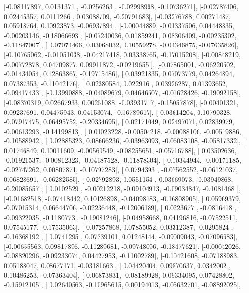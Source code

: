 \documentclass{article}
\begin{document}
       [-0.08117897,  0.0131371 , -0.0256263 , -0.02998998, -0.10736271],
       [-0.02787406,  0.02445357,  0.0111266 ,  0.03088709, -0.20791683],
       [-0.03276788,  0.00271487,  0.05918764,  0.10923873, -0.06937894],
       [-0.00044889, -0.01337506,  0.04448835, -0.00203146, -0.18066693],
       [-0.07240036,  0.01859241,  0.08306409, -0.00235302, -0.11847007],
       [ 0.07074466,  0.03068032,  0.10559278, -0.04346875, -0.07635826],
       [-0.10765062, -0.01051038, -0.04217418,  0.03338765, -0.17015208],
       [-0.00848219, -0.00772878,  0.04709877,  0.09911872, -0.0219655 ],
       [-0.07865001, -0.06220502, -0.01434054,  0.12863867, -0.19715486],
       [ 0.03921835,  0.07073779,  0.04264894,  0.07387353, -0.11042176],
       [ 0.02380584,  0.022916  ,  0.03926287,  0.01393652, -0.09417433],
       [-0.13990888, -0.04089679,  0.04646507, -0.01628426, -0.19092158],
       [-0.08370319,  0.02667933,  0.00251088, -0.03931717, -0.15057878],
       [-0.00401321,  0.09237691,  0.04475943,  0.04153074, -0.16789617],
       [-0.03614204,  0.10790328, -0.07917475,  0.06495752, -0.20334695],
       [ 0.02171049,  0.02497071,  0.02839979, -0.00613293, -0.14199813],
       [ 0.01023228, -0.00504218, -0.00088106, -0.00519886, -0.10588942],
       [ 0.02885323,  0.08666236, -0.03963093, -0.06083108, -0.05817332],
       [ 0.01746849,  0.10011609, -0.00560549, -0.08255651, -0.05716788],
       [ 0.03502636, -0.01921537, -0.00812323, -0.04187528, -0.11878304],
       [-0.10344944, -0.00171185, -0.02747262,  0.00807871, -0.10797283],
       [ 0.0794393 , -0.07562552, -0.06121037,  0.06828691, -0.06282585],
       [ 0.02792893,  0.0551154 ,  0.03669073, -0.03949868, -0.20085657],
       [ 0.0102529 , -0.00212218, -0.09104913, -0.09034847, -0.1081468 ],
       [-0.01682518, -0.07418442,  0.10126898, -0.04098183, -0.16808905],
       [ 0.05969379, -0.07015314,  0.06644706, -0.02236448, -0.12006189],
       [ 0.0223677 , -0.0816418 , -0.09322035, -0.1180773 , -0.19081246],
       [-0.04958668,  0.04196816, -0.07522511,  0.07545177, -0.17535063],
       [ 0.07257868,  0.07855052,  0.03312387, -0.0295824 , -0.16368192],
       [ 0.0741295 ,  0.07339101,  0.01248144, -0.09009043, -0.07096683],
       [-0.00655563,  0.09817896, -0.11289681, -0.09748096, -0.18477621],
       [-0.00042026, -0.08820296, -0.09233074,  0.04427953, -0.11002789],
       [-0.10421608, -0.07188983,  0.05188047,  0.08677171, -0.03181663],
       [ 0.04420404,  0.09870637,  0.0342002 ,  0.10486253, -0.07363404],
       [-0.06873831, -0.08189928,  0.09334095,  0.07428802, -0.15912105],
       [ 0.02640563, -0.10965615,  0.00194013, -0.05632701, -0.08892025],
\end{document}
